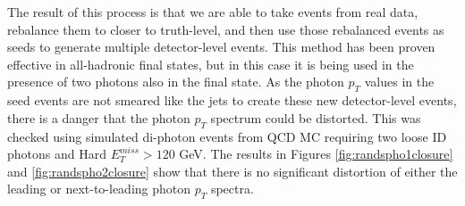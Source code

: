 The result of this process is that we are able to take events from real data, rebalance them to closer to truth-level, and then use those rebalanced events as seeds to generate multiple detector-level events.  This method has been proven effective in all-hadronic final states, but in this case it is being used in the presence of two photons also in the final state.  As the photon $p_T$ values in the seed events are not smeared like the jets to create these new detector-level events, there is a danger that the photon $p_T$ spectrum could be distorted.  This was checked using simulated di-photon events from QCD MC requiring two loose ID photons and Hard $E_T^{miss}>120$ GeV.  The results in Figures \ref{fig:randspho1closure} and \ref{fig:randspho2closure} show that there is no significant distortion of either the leading or next-to-leading photon $p_T$ spectra.


